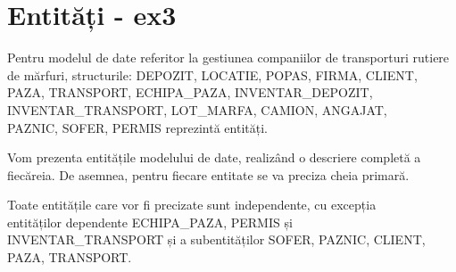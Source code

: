 \documentclass[12pt, a4paper]{article}
\begin{document}
\newpage
\section{Entități - ex3}
\quad \par
Pentru modelul de date referitor la gestiunea companiilor de transporturi rutiere de mărfuri, structurile: DEPOZIT, LOCATIE, POPAS, FIRMA, CLIENT, PAZA, TRANSPORT, ECHIPA\_PAZA, INVENTAR\_DEPOZIT, INVENTAR\_TRANSPORT, LOT\_MARFA, CAMION, ANGAJAT,\\ PAZNIC, SOFER, PERMIS reprezintă entități.

Vom prezenta entitățile modelului de date, realizând o descriere completă a fiecăreia. De asemnea, pentru fiecare entitate se va preciza cheia primară.

Toate entitățile care vor fi precizate sunt independente, cu excepția\\ entităților dependente ECHIPA\_PAZA, PERMIS și\\ INVENTAR\_TRANSPORT
și a subentităților SOFER, PAZNIC, CLIENT, PAZA, TRANSPORT.
\end{document}
